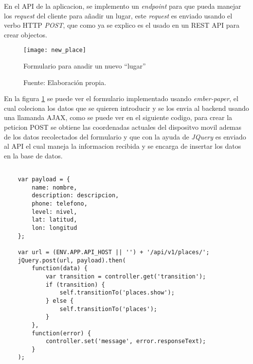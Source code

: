 
En el API de la aplicacion, se implemento un \emph{endpoint} para que pueda manejar los \emph{request} del cliente para añadir un lugar, este \emph{request} es enviado usando el verbo HTTP \emph{POST}, que como ya se explico es el usado en un REST API para crear objectos. \\


\begin{figure}[H]
      \begin{center}
        \texttt{[image: new\_place]}

        \caption{ Formulario para anadir un nuevo ``lugar''}
        \label{fig:new_place}
        \caption*{Fuente: Elaboración propia.}
      \end{center}
\end{figure}

En la figura \ref{fig:new_place} se puede ver el formulario implementado usando \emph{ember-paper}, el cual coleciona los datos que se quieren introducir y se los envia al backend usando una llamanda AJAX, como se puede ver en el siguiente codigo, para crear la peticion POST se obtiene las coordenadas actuales del dispositvo movil ademas de los datos recolectados del formulario y que con la ayuda de \emph{JQuery} es enviado al API el cual maneja la informacion recibida y se encarga de insertar los datos en la base de datos.\\


%
\begin{center}
  \begin{lstlisting}[label=new_place_request,caption=POST request creado en el controlador de \emph{ember}]

    var payload = {
        name: nombre,
        description: descripcion,
        phone: telefono,
        level: nivel,
        lat: latitud,
        lon: longitud
    };

    var url = (ENV.APP.API_HOST || '') + '/api/v1/places/';
    jQuery.post(url, payload).then(
        function(data) {
            var transition = controller.get('transition');
            if (transition) {
                self.transitionTo('places.show');
            } else {
                self.transitionTo('places');
            }
        },
        function(error) {
            controller.set('message', error.responseText);
        }
    );

  \end{lstlisting}
\end{center}

